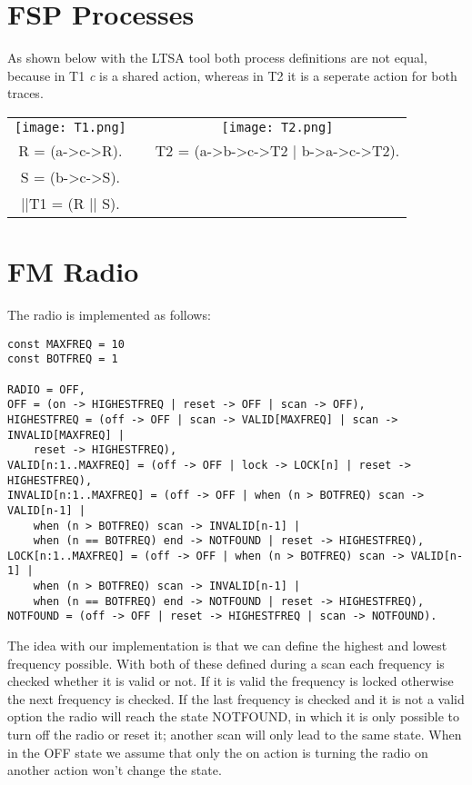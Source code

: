 \documentclass{report}
\begin{document}
	\section{FSP Processes}
	\startsection
		As shown below with the LTSA tool both process definitions are not equal, because in T1 \textit{c} is a shared action, whereas in T2 it is a seperate action for both traces. \\
		\begin{tabular}{ccc}
			\texttt{[image: T1.png]} && \texttt{[image: T2.png]} \\
			R = (a->c->R). && T2 = (a->b->c->T2 | b->a->c->T2). \\
			S = (b->c->S). \\
			||T1 = (R || S).
		\end{tabular}
	\closesection
	
	\newpage	
	
	\section{FM Radio}
	\startsection
		The radio is implemented as follows:
		\startsubsection
			\begin{verbatim}
const MAXFREQ = 10
const BOTFREQ = 1

RADIO = OFF,
OFF = (on -> HIGHESTFREQ | reset -> OFF | scan -> OFF),
HIGHESTFREQ = (off -> OFF | scan -> VALID[MAXFREQ] | scan -> INVALID[MAXFREQ] | 
	reset -> HIGHESTFREQ),
VALID[n:1..MAXFREQ] = (off -> OFF | lock -> LOCK[n] | reset -> HIGHESTFREQ),
INVALID[n:1..MAXFREQ] = (off -> OFF | when (n > BOTFREQ) scan -> VALID[n-1] | 
	when (n > BOTFREQ) scan -> INVALID[n-1] | 
	when (n == BOTFREQ) end -> NOTFOUND | reset -> HIGHESTFREQ),
LOCK[n:1..MAXFREQ] = (off -> OFF | when (n > BOTFREQ) scan -> VALID[n-1] | 
	when (n > BOTFREQ) scan -> INVALID[n-1] | 
	when (n == BOTFREQ) end -> NOTFOUND | reset -> HIGHESTFREQ),
NOTFOUND = (off -> OFF | reset -> HIGHESTFREQ | scan -> NOTFOUND).
			\end{verbatim}
		\closesection
		The idea with our implementation is that we can define the highest and lowest frequency possible. With both of these defined during a scan each frequency is checked whether it is valid or not. If it is valid the frequency is locked otherwise the next frequency is checked. If the last frequency is checked and it is not a valid option the radio will reach the state NOTFOUND, in which it is only possible to turn off the radio or reset it; another scan will only lead to the same state. When in the OFF state we assume that only the on action is turning the radio on another action won't change the state.
	\closesection
	
\end{document}
